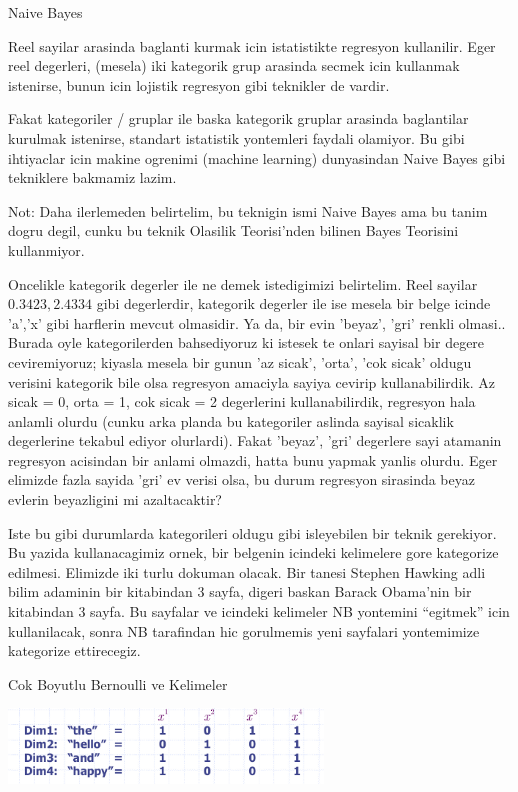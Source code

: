 \documentclass[12pt,fleqn]{article}
\begin{document}
Naive Bayes

Reel sayilar arasinda baglanti kurmak icin istatistikte regresyon
kullanilir. Eger reel degerleri, (mesela) iki kategorik grup arasinda secmek
icin kullanmak istenirse, bunun icin lojistik regresyon gibi teknikler de
vardir.

Fakat kategoriler / gruplar ile baska kategorik gruplar arasinda
baglantilar kurulmak istenirse, standart istatistik yontemleri faydali
olamiyor. Bu gibi ihtiyaclar icin makine ogrenimi (machine learning)
dunyasindan Naive Bayes gibi tekniklere bakmamiz lazim.

Not: Daha ilerlemeden belirtelim, bu teknigin ismi Naive Bayes ama bu tanim
dogru degil, cunku bu teknik Olasilik Teorisi'nden bilinen Bayes Teorisini
kullanmiyor.

Oncelikle kategorik degerler ile ne demek istedigimizi belirtelim. Reel
sayilar $0.3423, 2.4334$ gibi degerlerdir, kategorik degerler ile ise
mesela bir belge icinde 'a','x' gibi harflerin mevcut olmasidir. Ya da, bir
evin 'beyaz', 'gri' renkli olmasi.. Burada oyle kategorilerden bahsediyoruz
ki istesek te onlari sayisal bir degere ceviremiyoruz; kiyasla mesela bir
gunun 'az sicak', 'orta', 'cok sicak' oldugu verisini kategorik bile olsa
regresyon amaciyla sayiya cevirip kullanabilirdik. Az sicak = 0, orta = 1,
cok sicak = 2 degerlerini kullanabilirdik, regresyon hala anlamli olurdu
(cunku arka planda bu kategoriler aslinda sayisal sicaklik degerlerine
tekabul ediyor olurlardi). Fakat 'beyaz', 'gri' degerlere sayi atamanin
regresyon acisindan bir anlami olmazdi, hatta bunu yapmak yanlis
olurdu. Eger elimizde fazla sayida 'gri' ev verisi olsa, bu durum regresyon
sirasinda beyaz evlerin beyazligini mi azaltacaktir?

Iste bu gibi durumlarda kategorileri oldugu gibi isleyebilen bir teknik
gerekiyor. Bu yazida kullanacagimiz ornek, bir belgenin icindeki kelimelere
gore kategorize edilmesi. Elimizde iki turlu dokuman olacak. Bir tanesi
Stephen Hawking adli bilim adaminin bir kitabindan 3 sayfa, digeri baskan
Barack Obama'nin bir kitabindan 3 sayfa. Bu sayfalar ve icindeki kelimeler
NB yontemini ``egitmek'' icin kullanilacak, sonra NB tarafindan hic
gorulmemis yeni sayfalari yontemimize kategorize ettirecegiz.

Cok Boyutlu Bernoulli ve Kelimeler

\includegraphics[height=2cm]{dims.png}
\end{document}
